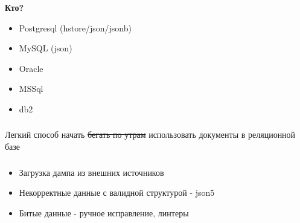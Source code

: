 \documentclass[18pt, compress, aspectratio=169]{beamer}
\begin{document}
\begin{frame}
    \frametitle{}
    \begin{center}
        \textbf{Кто?}
        \begin{itemize}[label={\MVRightarrow}]
            \item Postgresql (hstore/json/jsonb)
            \item MySQL (json)
            \item Oracle
            \item MSSql
            \item db2
        \end{itemize}
    \end{center}
\end{frame}

\fontsize{13pt}{14}\selectfont
\begin{frame}
    \frametitle{}
    \vspace{2em}
    \centering
    \begin{minipage}{32em}
        Легкий способ начать \sout{бегать по утрам} использовать документы в реляционной базе
    \end{minipage}
\end{frame}
\fontsize{17pt}{18}\selectfont




\begin{frame}
    \frametitle{}
    \begin{center}
        \begin{itemize}[label={\MVRightarrow}]
            \item Загрузка дампа из внешних источников
            \item Некорректные данные с валидной структурой - json5
            \item Битые данные - ручное исправление, линтеры
        \end{itemize}
    \end{center}
\end{frame}
\end{document}
